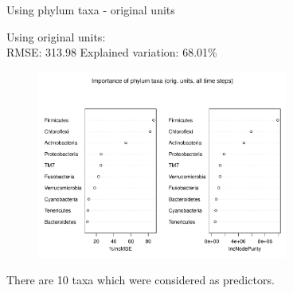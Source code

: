 \documentclass{beamer}
\begin{document}
\begin{frame}{Using phylum taxa - original units}
  
  {\scriptsize
    
  \noindent Using original units:\\
  RMSE: 313.98  \hspace{0.05in}  Explained variation: 68.01\%

  \begin{center}
    \begin{figure}
      \includegraphics[width=3.25in]{../only_phyla/all_time_steps/orig_units_all_data_phyla_imp_plot}
    \end{figure}
  \end{center}
  \vspace{-0.25in}

\noindent There are 10 taxa which were considered as predictors.
}

\end{frame}
\end{document}
